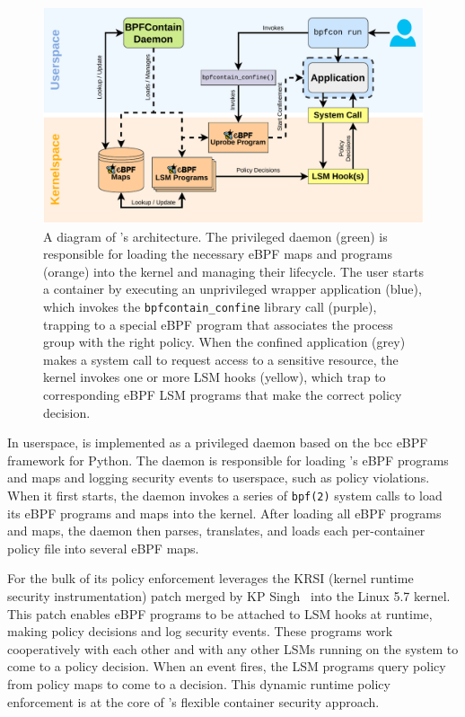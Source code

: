 \begin{figure}[htb]
  \centering
  \includegraphics[width=0.8\linewidth]{figs/architecture.pdf}
  \caption{
    A diagram of \bpfcontain{}'s architecture. The privileged daemon (green) is responsible for loading the necessary eBPF maps and programs (orange) into the kernel and managing their lifecycle. The user starts a container by executing an unprivileged wrapper application (blue), which invokes the \texttt{bpfcontain\_confine} library call (purple), trapping to a special eBPF program that associates the process group with the right policy.  When the confined application (grey) makes a system call to request access to a sensitive resource, the kernel invokes one or more LSM hooks (yellow), which trap to corresponding eBPF LSM programs that make the correct policy decision.
  }%
  \label{fig:architecture}
\end{figure}

In userspace, \bpfcontain{} is implemented as a privileged daemon based on the bcc \cite{bcc} eBPF framework for Python. The daemon is responsible for loading \bpfcontain{}'s eBPF programs and maps and logging security events to userspace, such as policy violations.  When it first starts, the daemon invokes a series of \texttt{bpf(2)} system calls to load its eBPF programs and maps into the kernel. After loading all eBPF programs and maps, the daemon then parses, translates, and loads each per-container policy file into several eBPF maps.

For the bulk of its policy enforcement \bpfcontain{} leverages the KRSI (kernel runtime security instrumentation) patch merged by KP Singh~\cite{singh2019_krsi,corbet2019_krsi} into the Linux 5.7 kernel. This patch enables eBPF programs to be attached to LSM hooks at runtime, making policy decisions and log security events.  These programs work cooperatively with each other and with any other LSMs running on the system to come to a policy decision. When an event fires, the LSM programs query policy from policy maps to come to a decision. This dynamic runtime policy enforcement is at the core of \bpfcontain{}'s flexible container security approach.

